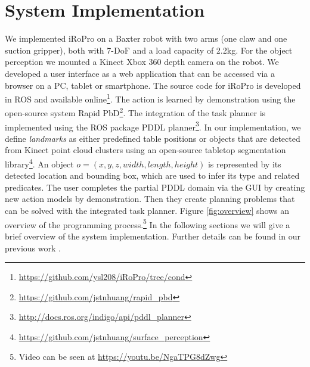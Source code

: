 \section{System Implementation} \label{sec:implementation}
We implemented iRoPro on a Baxter robot with two arms (one claw and one suction gripper), both with 7-DoF and a load capacity of 2.2kg.
For the object perception we mounted a Kinect Xbox 360 depth camera on the robot.
We developed a user interface as a web application that can be accessed via a browser on a PC, tablet or smartphone.
The source code for iRoPro is developed in ROS \cite{quigley2009ros} and available online\footnote{\url{https://github.com/ysl208/iRoPro/tree/cond}}.
The action is learned by demonstration using the open-source system Rapid PbD\footnote{\url{https://github.com/jstnhuang/rapid_pbd}}.
The integration of the task planner is implemented using the ROS package PDDL planner\footnote{\url{http://docs.ros.org/indigo/api/pddl_planner}}.
In our implementation, we define \textit{landmarks} as either predefined table positions or objects that are detected from Kinect point cloud clusters using an open-source tabletop segmentation library\footnote{\url{https://github.com/jstnhuang/surface_perception}}.
An object $o = (x,y,z, width, length, height)$ is represented by its detected location and bounding box, which are used to infer its type and related predicates.
The user completes the partial PDDL domain via the GUI by creating new action models by demonstration.
Then they create planning problems that can be solved with the integrated task planner.
Figure \ref{fig:overview} shows an overview of the programming process.\footnote{Video can be seen at \url{https://youtu.be/NgaTPG8dZwg}}
In the following sections we will give a brief overview of the system implementation.
Further details can be found in our previous work \cite{liang2019d}.

